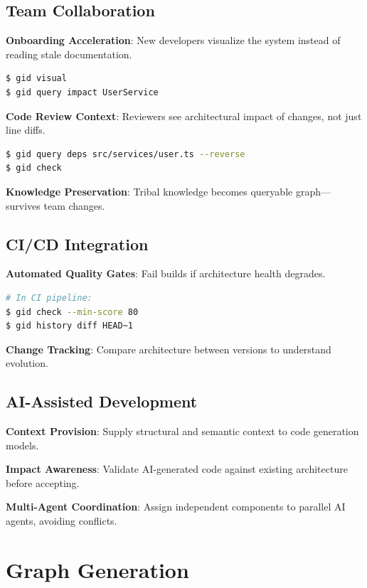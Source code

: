 \documentclass[11pt,a4paper]{article}
\begin{document}
\subsection{Team Collaboration}

\textbf{Onboarding Acceleration}: New developers visualize the system instead of reading stale documentation.

\begin{lstlisting}[language=bash]
$ gid visual
$ gid query impact UserService
\end{lstlisting}

\textbf{Code Review Context}: Reviewers see architectural impact of changes, not just line diffs.

\begin{lstlisting}[language=bash]
$ gid query deps src/services/user.ts --reverse
$ gid check
\end{lstlisting}

\textbf{Knowledge Preservation}: Tribal knowledge becomes queryable graph---survives team changes.

\subsection{CI/CD Integration}

\textbf{Automated Quality Gates}: Fail builds if architecture health degrades.

\begin{lstlisting}[language=bash]
# In CI pipeline:
$ gid check --min-score 80
$ gid history diff HEAD~1
\end{lstlisting}

\textbf{Change Tracking}: Compare architecture between versions to understand evolution.

\subsection{AI-Assisted Development}

\textbf{Context Provision}: Supply structural and semantic context to code generation models.

\textbf{Impact Awareness}: Validate AI-generated code against existing architecture before accepting.

\textbf{Multi-Agent Coordination}: Assign independent components to parallel AI agents, avoiding conflicts.

\section{Graph Generation}
\end{document}
